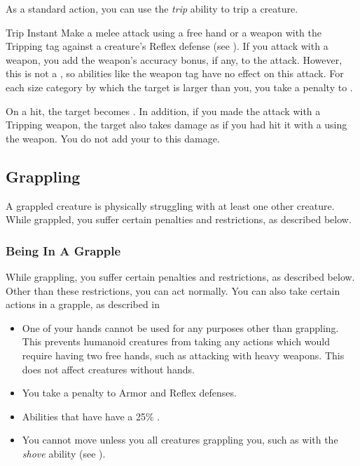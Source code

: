          As a standard action, you can use the \textit{trip} ability to trip a creature.

        \begin{instantability}{Trip}
            \label{Trip}
            Instant
            \rankline
            Make a melee attack using a free hand or a weapon with the Tripping tag against a creature's Reflex defense (see ).
            If you attack with a weapon, you add the weapon's accuracy bonus, if any, to the attack.
            However, this is not a , so abilities like the  weapon tag have no effect on this attack.
            For each size category by which the target is larger than you, you take a  penalty to .

            On a hit, the target becomes \prone.
            In addition, if you made the attack with a Tripping weapon, the target also takes damage as if you had hit it with a  using the weapon.
            You do not add your  to this damage.
        \end{instantability}

    \subsection{Grappling}\label{Grappling}
        A grappled creature is physically struggling with at least one other creature.
        While grappled, you suffer certain penalties and restrictions, as described below.

        \subsubsection{Being In A Grapple}
            While grappling, you suffer certain penalties and restrictions, as described below. Other than these restrictions, you can act normally. You can also take certain actions in a grapple, as described in 
            \begin{itemize}
                \item One of your hands cannot be used for any purposes other than grappling.
                    This prevents humanoid creatures from taking any actions which would require having two free hands, such as attacking with heavy weapons.
                    This does not affect creatures without hands.
                \item You take a  penalty to Armor and Reflex defenses.
                \item Abilities that have  have a 25\% .
                \item You cannot move unless you  all creatures grappling you, such as with the \textit{shove} ability (see ).
            \end{itemize}

